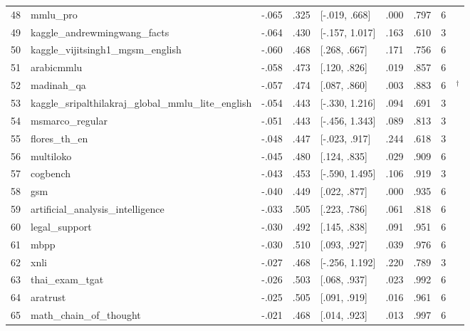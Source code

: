 \begin{longtable}{@{}r>{\raggedright\arraybackslash}p{}rrlrrr>{\raggedright\arraybackslash}p{}@{}}
48 & mmlu\_pro & -.065 & .325 & [-.019, .668] & .000 & .797 & 6 & \citealp{wang2024mmlu} \\
49 & kaggle\_andrewmingwang\_facts & -.064 & .430 & [-.157, 1.017] & .163 & .610 & 3 & \citealp{jacovi2025facts} \\
50 & kaggle\_vijitsingh1\_mgsm\_english & -.060 & .468 & [.268, .667] & .171 & .756 & 6 & \citealp{shi2022language} \\
51 & arabicmmlu & -.058 & .473 & [.120, .826] & .019 & .857 & 6 & \citealp{koto2024arabicmmlu} \\
52 & madinah\_qa & -.057 & .474 & [.087, .860] & .003 & .883 & 6 & \citealp{helm_arabic}$^\dagger$ \\
53 & kaggle\_sripalthilakraj\_global\_mmlu\_lite\_english & -.054 & .443 & [-.330, 1.216] & .094 & .691 & 3 & \citealp{singh2024global} \\
54 & msmarco\_regular & -.051 & .443 & [-.456, 1.343] & .089 & .813 & 3 & \citealp{campos2016ms} \\
55 & flores\_th\_en & -.048 & .447 & [-.023, .917] & .244 & .618 & 3 & \citealp{costajussa2022no} \\
56 & multiloko & -.045 & .480 & [.124, .835] & .029 & .909 & 6 & \citealp{hupkes2025multiloko} \\
57 & cogbench & -.043 & .453 & [-.590, 1.495] & .106 & .919 & 3 & \citealp{codaforno2024cogbench} \\
58 & gsm & -.040 & .449 & [.022, .877] & .000 & .935 & 6 & \citealp{cobbe2021training} \\
59 & artificial\_analysis\_intelligence & -.033 & .505 & [.223, .786] & .061 & .818 & 6 & \citealp{artificialanalysis_index} \\
60 & legal\_support & -.030 & .492 & [.145, .838] & .091 & .951 & 6 & \citealp{helm2023} \\
61 & mbpp & -.030 & .510 & [.093, .927] & .039 & .976 & 6 & \citealp{austin2021program} \\
62 & xnli & -.027 & .468 & [-.256, 1.192] & .220 & .789 & 3 & \citealp{conneau2018xnli} \\
63 & thai\_exam\_tgat & -.026 & .503 & [.068, .937] & .023 & .992 & 6 & \citealp{pipatanakul2023typhoon} \\
64 & aratrust & -.025 & .505 & [.091, .919] & .016 & .961 & 6 & \citealp{alghamdi2024aratrust} \\
65 & math\_chain\_of\_thought & -.021 & .468 & [.014, .923] & .013 & .997 & 6 & \citealp{hendrycks2021measuring} \\

\end{longtable}
